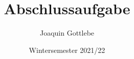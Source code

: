 \titlehead{\texttt{[image: Abbildungen/FULogo\_CMYK.pdf]} \\ & Fachbereich Geowissenschaften \\ Institut für Geographische Wissenschaften}
\subject{24203711 PS - Einführung in geographisches und wissenschaftliches Arbeiten} %
\title{Abschlussaufgabe}
\author{Joaquin Gottlebe} %
\date{Wintersemester 2021/22} %